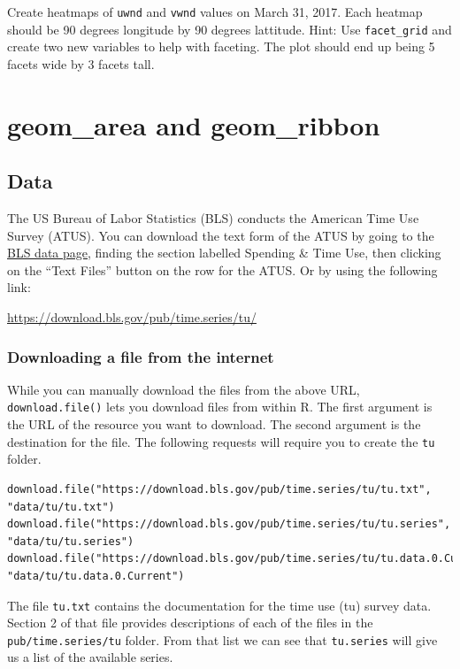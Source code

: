 \documentclass[]{book}
\theoremstyle{definition}
\theoremstyle{definition}
\theoremstyle{remark}
\begin{document}
Create heatmaps of \texttt{uwnd} and \texttt{vwnd} values on March 31,
2017. Each heatmap should be 90 degrees longitude by 90 degrees
lattitude. Hint: Use \texttt{facet\_grid} and create two new variables
to help with faceting. The plot should end up being 5 facets wide by 3
facets tall.

\hypertarget{area-and-ribbons}{\chapter{geom\_area and
geom\_ribbon}\label{area-and-ribbons}}

\section{Data}\label{data-5}

The US Bureau of Labor Statistics (BLS) conducts the American Time Use
Survey (ATUS). You can download the text form of the ATUS by going to
the \href{https://www.bls.gov/data/}{BLS data page}, finding the section
labelled Spending \& Time Use, then clicking on the ``Text Files''
button on the row for the ATUS. Or by using the following link:

\url{https://download.bls.gov/pub/time.series/tu/}

\subsection{Downloading a file from the
internet}\label{downloading-a-file-from-the-internet}

While you can manually download the files from the above URL,
\texttt{download.file()} lets you download files from within R. The
first argument is the URL of the resource you want to download. The
second argument is the destination for the file. The following requests
will require you to create the \texttt{tu} folder.

\begin{verbatim}
download.file("https://download.bls.gov/pub/time.series/tu/tu.txt", "data/tu/tu.txt")
download.file("https://download.bls.gov/pub/time.series/tu/tu.series", "data/tu/tu.series")
download.file("https://download.bls.gov/pub/time.series/tu/tu.data.0.Current", "data/tu/tu.data.0.Current")
\end{verbatim}

The file \texttt{tu.txt} contains the documentation for the time use
(tu) survey data. Section 2 of that file provides descriptions of each
of the files in the \texttt{pub/time.series/tu} folder. From that list
we can see that \texttt{tu.series} will give us a list of the available
series.
\end{document}
